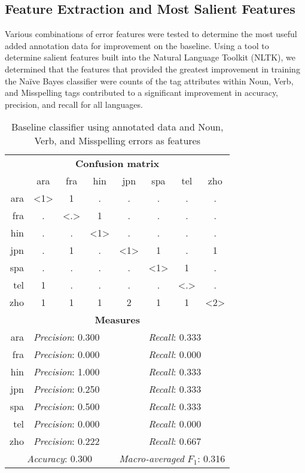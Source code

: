 \documentclass[10pt, a4paper]{article}
\begin{document}
\subsection{Feature Extraction and Most Salient Features}
Various combinations of error features were tested to determine the most useful added annotation data for improvement on the baseline. Using a tool to determine salient features built into the Natural Language Toolkit (NLTK), we determined that the features that provided the greatest improvement in training the Naïve Bayes classifier were counts of the tag attributes within Noun, Verb, and Misspelling tags contributed to a significant improvement in accuracy, precision, and recall for all languages. 

\begin{table}[!h]
	\begin{center}
		\begin{tabular}{r|c|c|c|c|c|c|c}	
			\multicolumn{8}{c}{\textbf{Confusion matrix}}\\
			~&ara & fra & hin & jpn & spa & tel & zho\\
			\hline
			ara & <1> & 1 & . & . & . & . & . \\
			fra & . & <.> & 1 & . & . & . & . \\
			hin & . & . & <1> & . & . & . & . \\
			jpn & . & 1 & . & <1> & 1 & . & 1 \\
			spa & . & . & . & . & <1> & 1 & . \\
			tel & 1 & . & . & . & . & <.> & . \\
			zho & 1 & 1 & 1 & 2 & 1 & 1 & <2> \\
			
			\multicolumn{8}{c}{\textbf{Measures}}\\
			ara & \multicolumn{4}{l}{\textit{Precision}: 0.300} & \multicolumn{3}{l}{\textit{Recall}: 0.333}	\\
			fra & \multicolumn{4}{l}{\textit{Precision}: 0.000} & \multicolumn{3}{l}{\textit{Recall}: 0.000}	\\
			hin & \multicolumn{4}{l}{\textit{Precision}: 1.000} & \multicolumn{3}{l}{\textit{Recall}: 0.333}	\\
			jpn & \multicolumn{4}{l}{\textit{Precision}: 0.250} & \multicolumn{3}{l}{\textit{Recall}: 0.333}	\\
			spa & \multicolumn{4}{l}{\textit{Precision}: 0.500} & \multicolumn{3}{l}{\textit{Recall}: 0.333}	\\
			tel & \multicolumn{4}{l}{\textit{Precision}: 0.000} & \multicolumn{3}{l}{\textit{Recall}: 0.000}	\\
			zho & \multicolumn{4}{l}{\textit{Precision}: 0.222} & \multicolumn{3}{l}{\textit{Recall}: 0.667}	\\
			\multicolumn{4}{c}{\textit{Accuracy}: 0.300} & \multicolumn{4}{l}{\textit{Macro-averaged }$F_1$: 0.316} 
		\end{tabular}
		\caption{Baseline classifier using annotated data and Noun, Verb, and Misspelling errors as features \label{table:bestfeatures}}
	\end{center}
\end{table}
\end{document}

